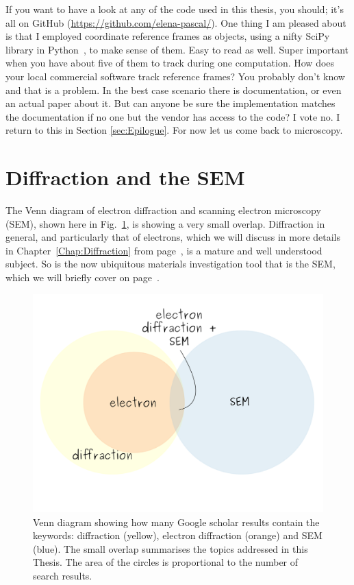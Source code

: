 If you want to have a look at any of the code used in this thesis, you should; it's all on GitHub (\href{https://github.com/elena-pascal/}{https://github.com/elena-pascal/}). One thing I am pleased about is that I employed coordinate reference frames as objects, using a nifty SciPy library in Python~\cite{ReferenceFrame}, to make sense of them. Easy to read as well. Super important when you have about five of them to track during one computation. How does your local commercial software track reference frames? You probably don't know and that is a problem. In the best case scenario there is documentation, or even an actual paper about it. But can anyone be sure the implementation matches the documentation if no one but the vendor has access to the code? I vote no. I return to this in Section \ref{sec:Epilogue}. For now let us come back to microscopy.     

\section{Diffraction and the SEM}


The Venn diagram of electron diffraction and scanning electron microscopy (SEM), shown here in Fig.~\ref{Fig:Venn}, is showing a very small overlap. Diffraction in general, and particularly that of electrons, which  we will discuss in more details in Chapter~\ref{Chap:Diffraction} from page~\pageref{Chap:Diffraction}, is a mature and well understood subject. So is the now ubiquitous materials investigation tool that is the SEM, which we will briefly cover on page~\pageref{sec:sem}. 

\begin{figure}[th]
\centering
\includegraphics[width=0.7\linewidth]{Figures/VenSEM.png}
\caption[SEM and electron diffraction Venn diagram.]{Venn diagram showing how many Google scholar results contain the keywords: diffraction (yellow), electron diffraction (orange) and SEM (blue). The small overlap  summarises the topics addressed in this Thesis. The area of the circles is proportional to the number of search results.}
\label{Fig:Venn}
\end{figure}

